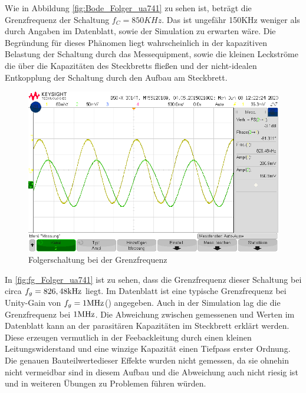 Wie in Abbildung \ref{fig:Bode_Folger_ua741} zu sehen ist, beträgt die Grenzfrequenz der Schaltung $f_C=850KHz$. Das ist ungefähr 150KHz weniger als durch Angaben im Datenblatt, sowie der Simulation zu erwarten wäre. Die Begründung für dieses Phänomen liegt wahrscheinlich in der kapazitiven Belastung der Schaltung durch das Messequipment, sowie die kleinen Leckströme die über die Kapazitäten des Steckbretts fließen und der nicht-idealen Entkopplung der Schaltung durch den Aufbau am Steckbrett. 
\begin{figure}[H]
    \centering
    \includegraphics[width=\costumPicWidth]{Lab_1/Messungen/Folger/fg.png}
    \caption{Folgerschaltung bei der Grenzfrequenz}
    \label{fig:fg_Folger_ua741}
\end{figure}

In \autoref{fig:fg_Folger_ua741} ist zu sehen, dass die Grenzfrequenz dieser Schaltung bei circa $f_g=826,48\text{kHz}$ liegt. Im Datenblatt ist eine typische Grenzfrequenz bei Unity-Gain von $f_g=1\text{MHz}$(\cite[9]{ti:ua741}) angegeben. Auch in der Simulation lag die die Grenzfrequenz bei $1\text{MHz}$. Die Abweichung zwischen gemessenen und Werten im Datenblatt kann an der parasitären Kapazitäten im Steckbrett erklärt werden. Diese erzeugen vermutlich in der Feebackleitung durch einen kleinen Leitungswiderstand und eine winzige Kapazität einen Tiefpass erster Ordnung. Die genauen \glqq Bauteilwerte\grqq dieser Effekte wurden nicht gemessen, da sie ohnehin nicht vermeidbar sind in diesem Aufbau und die Abweichung auch nicht riesig ist und in weiteren Übungen zu Problemen führen würden.

